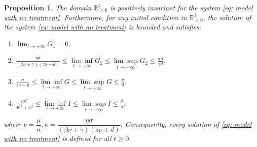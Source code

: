 \documentclass[a4paper,fleqn]{cas-sc}
\numberwithin{equation}{section}
\numberwithin{equation}{section}
\newcommand{\1}{\boldsymbol{1}}
\newcommand{\0}{\boldsymbol{0}}
\newtheorem{proposition}[theorem]{Proposition}
\begin{document}
\begin{proposition}
    The domain $\mathbb{R}^4_{\geq 0}$ is positively invariant for the system \eqref{eq: model with no treatment}. Furthermore, for any initial condition in $\mathbb{R}^4_{\geq 0}$, the solution of the system \eqref{eq: model with no treatment} is bounded and satisfies:
    \begin{enumerate}
        \item $\displaystyle\lim_{t \to +\infty} G_1 = 0,$
        \item $\displaystyle \frac{\eta \sigma}{\left(\beta\nu + \gamma\right)\left(z\nu + d\right)} \leq \underset{t \to +\infty}{\lim \inf} G_2 \leq \underset{t \to +\infty}{\lim \sup} G_2 \leq \frac{n\sigma}{\gamma d},$
        \item $\displaystyle \frac{\sigma}{z\nu + d}\leq \underset{t \to +\infty}{\lim \inf} G \leq \underset{t \to +\infty}{\lim \sup} G \leq \frac{\sigma}{d},$
        \item $\displaystyle \frac{\nu \kappa^2}{K^2 + \kappa^2}\leq \underset{t \to +\infty}{\lim \inf} I \leq \underset{t \to +\infty}{\lim \sup} I \leq \frac{\mu}{n},$
    \end{enumerate}
    where $\nu = \dfrac{\mu}{n}, \kappa = \dfrac{\eta \sigma}{\left(\beta\nu + \gamma\right)\left(z\nu + d\right)}.$
    Consequently, every solution of \eqref{eq: model with no treatment} is defined for all $t \geq 0$.
\end{proposition}
\end{document}
